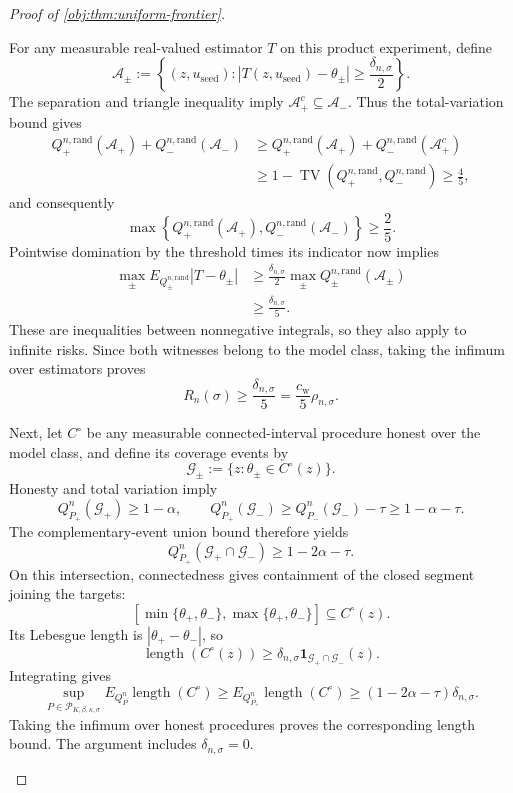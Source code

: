 \documentclass[11pt]{article}
\begin{document}
\begin{proof}[Proof of \cref{obj:thm:uniform-frontier}]
\begin{enumerate}
For any measurable real-valued estimator \(T\) on this product experiment, define
\[
\mathcal A_\pm
:=
\left\{(z,u_{\mathrm{seed}}):
|T(z,u_{\mathrm{seed}})-\theta_\pm|
\ge\frac{\delta_{n,\sigma}}2\right\}.
\]
The separation and triangle inequality imply
\(\mathcal A_+^c\subseteq\mathcal A_-\). Thus the total-variation bound gives
\[
\begin{aligned}
Q_+^{n,\mathrm{rand}}(\mathcal A_+)
+Q_-^{n,\mathrm{rand}}(\mathcal A_-)
&\ge
Q_+^{n,\mathrm{rand}}(\mathcal A_+)
+Q_-^{n,\mathrm{rand}}(\mathcal A_+^c)\\
&\ge
1-\operatorname{TV}(Q_+^{n,\mathrm{rand}},Q_-^{n,\mathrm{rand}})
\ge\frac45,
\end{aligned}
\]
and consequently
\[
\max\left\{
Q_+^{n,\mathrm{rand}}(\mathcal A_+),
Q_-^{n,\mathrm{rand}}(\mathcal A_-)
\right\}\ge\frac25.
\]
Pointwise domination by the threshold times its indicator now implies
\[
\begin{aligned}
\max_{\pm}E_{Q_\pm^{n,\mathrm{rand}}}|T-\theta_\pm|
&\ge
\frac{\delta_{n,\sigma}}2
\max_{\pm}Q_\pm^{n,\mathrm{rand}}(\mathcal A_\pm)\\
&\ge\frac{\delta_{n,\sigma}}5.
\end{aligned}
\]
These are inequalities between nonnegative integrals, so they also apply to infinite risks. Since both witnesses belong to the model class, taking the infimum over estimators proves
\[
R_n(\sigma)\ge\frac{\delta_{n,\sigma}}5
=\frac{c_{\mathrm w}}5\rho_{n,\sigma}.
\]

Next, let \(C^\circ\) be any measurable connected-interval procedure honest over the model class, and define its coverage events by
\[
\mathcal G_\pm:=\{z:\theta_\pm\in C^\circ(z)\}.
\]
Honesty and total variation imply
\[
Q_{P_+}^n(\mathcal G_+)\ge1-\alpha,
\qquad
Q_{P_+}^n(\mathcal G_-)
\ge Q_{P_-}^n(\mathcal G_-)-\tau
\ge1-\alpha-\tau.
\]
The complementary-event union bound therefore yields
\[
Q_{P_+}^n(\mathcal G_+\cap\mathcal G_-)
\ge1-2\alpha-\tau.
\]
On this intersection, connectedness gives containment of the closed segment joining the targets:
\[
[\min\{\theta_+,\theta_-\},\max\{\theta_+,\theta_-\}]
\subseteq C^\circ(z).
\]
Its Lebesgue length is \(|\theta_+-\theta_-|\), so
\[
\operatorname{length}(C^\circ(z))
\ge
\delta_{n,\sigma}\mathbf1_{\mathcal G_+\cap\mathcal G_-}(z).
\]
Integrating gives
\[
\sup_{P\in\mathcal P_{K,\beta,\kappa,\sigma}}
E_{Q_P^n}\operatorname{length}(C^\circ)
\ge
E_{Q_{P_+}^n}\operatorname{length}(C^\circ)
\ge(1-2\alpha-\tau)\delta_{n,\sigma}.
\]
Taking the infimum over honest procedures proves the corresponding length bound. The argument includes \(\delta_{n,\sigma}=0\).


\end{enumerate}
\end{proof}
\end{document}
